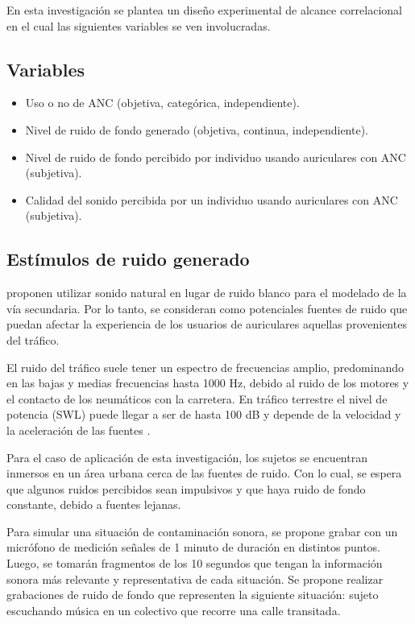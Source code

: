 \documentclass[a4paper,12pt]{article}
\begin{document}
En esta investigación se plantea un diseño experimental de alcance correlacional en el cual las siguientes variables se ven involucradas.

\subsection{Variables}
\label{sec:variables}

\begin{itemize}[label=\textbullet]
    \item Uso o no de ANC (objetiva, categórica, independiente).

    \item Nivel de ruido de fondo generado (objetiva, continua, independiente).

    \item Nivel de ruido de fondo percibido por individuo usando auriculares con ANC (subjetiva).

    \item Calidad del sonido percibida por un individuo usando auriculares con ANC (subjetiva).
\end{itemize}

\subsection{Estímulos de ruido generado}
\label{sec:generatedNoise}

\textcite[][3]{Kuo2018} proponen utilizar sonido natural en lugar de ruido blanco para el modelado de la vía secundaria.
Por lo tanto, se consideran como potenciales fuentes de ruido que puedan afectar la experiencia de los usuarios de auriculares aquellas provenientes del tráfico.

El ruido del tráfico suele tener un espectro de frecuencias amplio, predominando en las bajas y medias frecuencias hasta 1000 $\si{\hertz}$, debido al ruido de los motores y el contacto de los neumáticos con la carretera.
En tráfico terrestre el nivel de potencia (SWL) puede llegar a ser de hasta 100 \si{\deci \bel} y depende de la velocidad y la aceleración de las fuentes \parencite{Can2010}.

Para el caso de aplicación de esta investigación, los sujetos se encuentran inmersos en un área urbana cerca de las fuentes de ruido.
Con lo cual, se espera que algunos ruidos percibidos sean impulsivos y que haya ruido de fondo constante, debido a fuentes lejanas.

Para simular una situación de contaminación sonora, se propone grabar con un micrófono de medición señales de 1 minuto de duración en distintos puntos.
Luego, se tomarán fragmentos de los 10 segundos que tengan la información sonora más relevante y representativa de cada situación.
Se propone realizar grabaciones de ruido de fondo que representen la siguiente situación: sujeto escuchando música en un colectivo que recorre una calle transitada.
\end{document}
